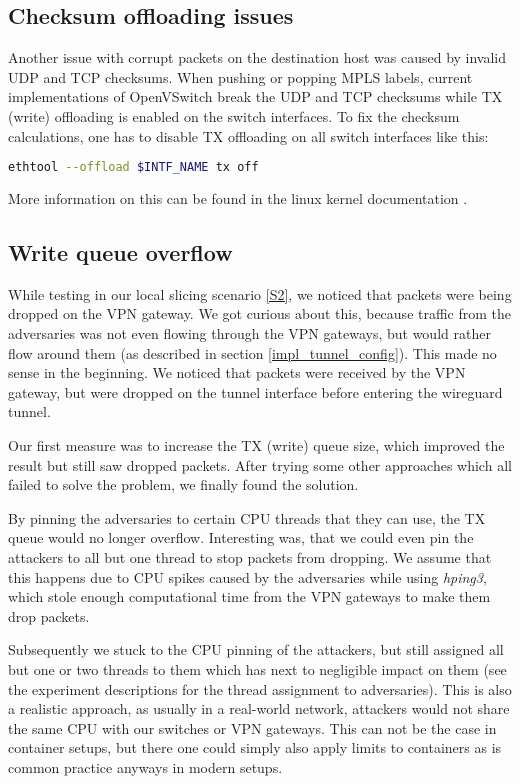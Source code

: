 \subsection{Checksum offloading issues}
Another issue with corrupt packets on the destination host was caused by invalid UDP and TCP checksums. When pushing or popping MPLS labels, current implementations of OpenVSwitch break the UDP and TCP checksums while TX (write) offloading is enabled on the switch interfaces. To fix the checksum calculations, one has to disable TX offloading on all switch interfaces like this:

\begin{lstlisting}[language=bash]
ethtool --offload $INTF_NAME tx off
\end{lstlisting}

More information on this can be found in the linux kernel documentation \cite{txoffload}.

\subsection{Write queue overflow}
While testing in our local slicing scenario \ref{S2}, we noticed that packets were being dropped on the VPN gateway. We got curious about this, because traffic from the adversaries was not even flowing through the VPN gateways, but would rather flow around them (as described in section \ref{impl_tunnel_config}). This made no sense in the beginning. We noticed that packets were received by the VPN gateway, but were dropped on the tunnel interface before entering the wireguard tunnel.

Our first measure was to increase the TX (write) queue size, which improved the result but still saw dropped packets. After trying some other approaches which all failed to solve the problem, we finally found the solution.

By pinning the adversaries to certain CPU threads that they can use, the TX queue would no longer overflow. Interesting was, that we could even pin the attackers to all but one thread to stop packets from dropping. We assume that this happens due to CPU spikes caused by the adversaries while using \textit{hping3}, which stole enough computational time from the VPN gateways to make them drop packets.

Subsequently we stuck to the CPU pinning of the attackers, but still assigned all but one or two threads to them which has next to negligible impact on them (see the experiment descriptions for the thread assignment to adversaries). This is also a realistic approach, as usually in a real-world network, attackers would not share the same CPU with our switches or VPN gateways. This can not be the case in container setups, but there one could simply also apply limits to containers as is common practice anyways in modern setups.
